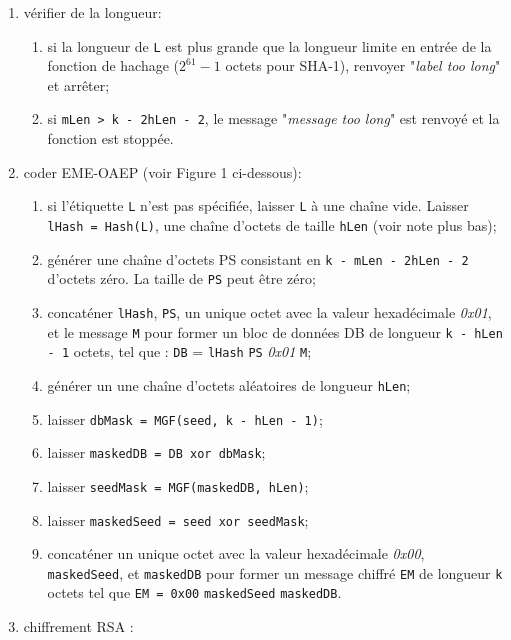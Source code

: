 \begin{enumerate}
	\item vérifier de la longueur:
	\begin{enumerate}
		\item si la longueur de \texttt{L} est plus grande que la longueur limite en entrée de la fonction de hachage ($2^{61} - 1$ octets pour SHA-1), renvoyer "\textit{label too long}" et arrêter;      
		\item si \texttt{mLen > k - 2hLen - 2}, le message "\textit{message too long}" est renvoyé et la fonction est stoppée.\\
	\end{enumerate}
	\item coder EME-OAEP (voir Figure 1 ci-dessous):
	\begin{enumerate}
		\item si l'étiquette \texttt{L} n'est pas spécifiée, laisser \texttt{L} à une chaîne vide. Laisser \texttt{lHash = Hash(L)}, une chaîne d'octets de taille \texttt{hLen} (voir note plus bas);
		\item générer une chaîne d'octets PS consistant en \texttt{k - mLen - 2hLen - 2} d'octets zéro. La taille de \texttt{PS} peut être zéro;
		\item concaténer \texttt{lHash}, \texttt{PS}, un unique octet avec la valeur hexadécimale \textit{0x01}, et le message \texttt{M} pour former un bloc de données DB de longueur \texttt{k - hLen - 1} octets, tel que : \texttt{DB} = \texttt{lHash} \textbar\textbar \texttt{PS} \textbar\textbar \textit{0x01} \textbar\textbar \texttt{M};
		\item générer un une chaîne d'octets aléatoires de longueur \texttt{hLen};
		\item laisser \texttt{dbMask = MGF(seed, k - hLen - 1)};
		\item laisser \texttt{maskedDB = DB xor dbMask};
		\item laisser \texttt{seedMask = MGF(maskedDB, hLen)};
		\item laisser \texttt{maskedSeed = seed xor seedMask};
		\item concaténer un unique octet avec la valeur hexadécimale \textit{0x00}, \texttt{maskedSeed}, et \texttt{maskedDB} pour former un message chiffré \texttt{EM} de longueur \texttt{k} octets tel que \texttt{EM = 0x00} \textbar\textbar \texttt{maskedSeed} \textbar\textbar \texttt{maskedDB}.\\
	\end{enumerate}
	\item chiffrement RSA :

\end{enumerate}
